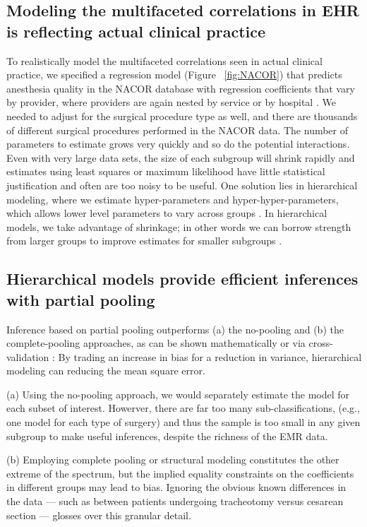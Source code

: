 \documentclass[11pt,notitlepage]{article}
\begin{document}
\subsection*{Modeling the multifaceted correlations in EHR is reflecting actual clinical practice}
To realistically model the multifaceted correlations seen in actual clinical 
practice, we specified a regression model  (Figure~ \ref{fig:NACOR}) 
that predicts anesthesia quality in the NACOR database
with regression coefficients that vary by provider, where providers 
are again nested by service or by hospital 
\cite{AndreaeWhite2015}. We needed to adjust for the surgical procedure 
type as well, and there are thousands 
of different surgical procedures performed in the NACOR data. The number 
of parameters to estimate grows very quickly 
and so do the potential interactions. Even with very large data sets, the  
size of each subgroup will shrink rapidly and estimates using least squares or 
maximum likelihood have little statistical justification and often are 
too noisy to be useful. 
One solution lies in hierarchical modeling, where we estimate hyper-parameters 
and hyper-hyper-parameters, which allows lower 
level parameters to vary across groups \cite{Bafumi_Gelman_2007}. 
In hierarchical models, we take advantage of shrinkage; in other words we 
can borrow strength from larger groups to improve estimates for smaller 
subgroups \cite{ParkGelman2004bayesian}.

\subsection*{Hierarchical models provide efficient inferences with partial pooling}
Inference based on partial pooling outperforms (a) the no-pooling and (b) the 
complete-pooling approaches, as can be shown mathematically \cite{Efron_1975} 
or via cross-validation \cite{Gelman-Hill_2014}: By trading an increase in bias 
for a reduction in variance, hierarchical modeling can reducing the mean square error.  

(a) Using the no-pooling approach, we would separately estimate the model for each 
subset of interest. Howerver, there are far too many sub-classifications, 
(e.g., one model for each type of surgery) and thus the sample is too small in any given 
subgroup to make useful inferences, despite the richness of the EMR data.

(b) Employing complete pooling or structural modeling constitutes the other extreme 
of the spectrum, but the implied equality constraints on the coefficients in different 
groups may lead to bias. Ignoring the obvious known differences in the data --- such 
as between patients undergoing tracheotomy versus cesarean section --- glosses
over this granular detail.
\end{document}
